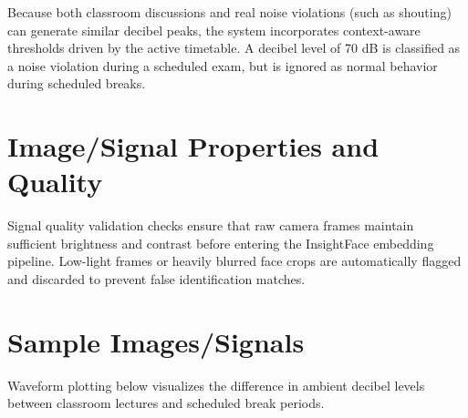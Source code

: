 \documentclass[12pt,a4paper,oneside]{report}
\begin{document}
Because both classroom discussions and real noise violations (such as shouting) can generate similar decibel peaks, the system incorporates context-aware thresholds driven by the active timetable. A decibel level of 70 dB is classified as a noise violation during a scheduled exam, but is ignored as normal behavior during scheduled breaks.

\section{Image/Signal Properties and Quality}
Signal quality validation checks ensure that raw camera frames maintain sufficient brightness and contrast before entering the InsightFace embedding pipeline. Low-light frames or heavily blurred face crops are automatically flagged and discarded to prevent false identification matches.

\section{Sample Images/Signals}
Waveform plotting below visualizes the difference in ambient decibel levels between classroom lectures and scheduled break periods.
\end{document}
